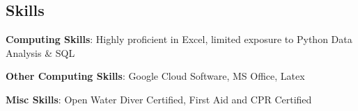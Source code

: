 \documentclass[margin,line]{res}
\begin{document}
\begin{resume}
\section{\sc Skills} 
{\bf Computing Skills}:  Highly proficient in Excel, limited exposure to Python Data Analysis \& SQL
\vspace*{-3mm}

{\bf Other Computing Skills}: Google Cloud Software, MS Office, Latex
\vspace*{-3mm}

{\bf Misc Skills}: Open Water Diver Certified, First Aid and CPR Certified
\vspace*{-3mm}

\end{resume}
\end{document}
